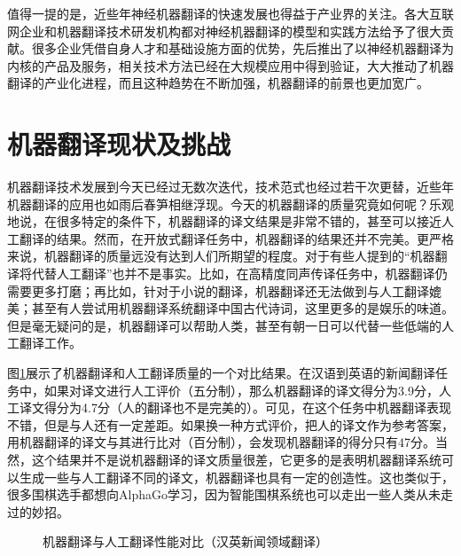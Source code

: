 \parinterval 值得一提的是，近些年神经机器翻译的快速发展也得益于产业界的关注。各大互联网企业和机器翻译技术研发机构都对神经机器翻译的模型和实践方法给予了很大贡献。很多企业凭借自身人才和基础设施方面的优势，先后推出了以神经机器翻译为内核的产品及服务，相关技术方法已经在大规模应用中得到验证，大大推动了机器翻译的产业化进程，而且这种趋势在不断加强，机器翻译的前景也更加宽广。


\sectionnewpage
\section{机器翻译现状及挑战}
\parinterval 机器翻译技术发展到今天已经过无数次迭代，技术范式也经过若干次更替，近些年机器翻译的应用也如雨后春笋相继浮现。今天的机器翻译的质量究竟如何呢？乐观地说，在很多特定的条件下，机器翻译的译文结果是非常不错的，甚至可以接近人工翻译的结果。然而，在开放式翻译任务中，机器翻译的结果还并不完美。更严格来说，机器翻译的质量远没有达到人们所期望的程度。对于有些人提到的“机器翻译将代替人工翻译”也并不是事实。比如，在高精度同声传译任务中，机器翻译仍需要更多打磨；再比如，针对于小说的翻译，机器翻译还无法做到与人工翻译媲美；甚至有人尝试用机器翻译系统翻译中国古代诗词，这里更多的是娱乐的味道。但是毫无疑问的是，机器翻译可以帮助人类，甚至有朝一日可以代替一些低端的人工翻译工作。

\parinterval 图\ref{fig:1-6}展示了机器翻译和人工翻译质量的一个对比结果。在汉语到英语的新闻翻译任务中，如果对译文进行人工评价（五分制），那么机器翻译的译文得分为3.9分，人工译文得分为4.7分（人的翻译也不是完美的）。可见，在这个任务中机器翻译表现不错，但是与人还有一定差距。如果换一种方式评价，把人的译文作为参考答案，用机器翻译的译文与其进行比对（百分制），会发现机器翻译的得分只有47分。当然，这个结果并不是说机器翻译的译文质量很差，它更多的是表明机器翻译系统可以生成一些与人工翻译不同的译文，机器翻译也具有一定的创造性。这也类似于，很多围棋选手都想向AlphaGo学习，因为智能围棋系统也可以走出一些人类从未走过的妙招。

\begin{figure}[htp]
   \centering

\setlength{\belowcaptionskip}{-0.5em}
    \caption{机器翻译与人工翻译性能对比（汉英新闻领域翻译）}
    \label{fig:1-6}
\end{figure}

